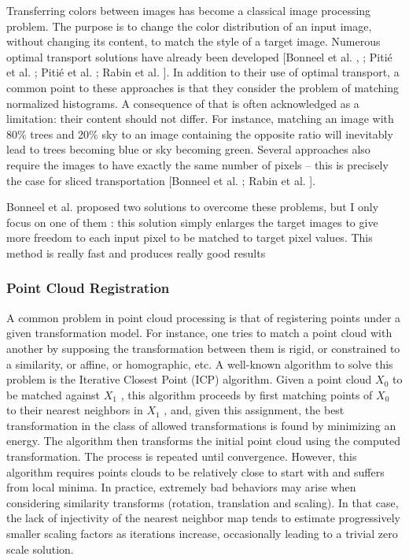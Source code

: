 \documentclass[a4paper,12pt]{article}
\begin{document}
Transferring colors between images has become a classical image processing problem. The purpose is to change the color distribution of an input image, without changing its content, to match the style of a target image. Numerous optimal transport solutions have already been developed [Bonneel et al. \cite{bonneel2015sliced}, \cite{bonneel2013example}; Pitié et al. \cite{pitie2005n}; Pitié et al. \cite{pitie2007automated}; Rabin et al. \cite{rabin2010regularization}]. In addition to their use of optimal transport, a common point to these approaches is that they consider the problem of matching normalized histograms. A consequence of that is often acknowledged as a limitation: their content should not differ. For instance, matching an image with 80\% trees and 20\% sky to an image containing the opposite ratio will inevitably lead to trees becoming blue or sky becoming green. Several approaches also require the images to have exactly the same number of pixels – this is precisely the case for sliced transportation [Bonneel et al. \cite{bonneel2015sliced}; Rabin et al. \cite{rabin2010regularization}].

Bonneel et al. proposed two solutions to overcome these problems, but I only focus on one of them : this solution simply enlarges the target images to give more freedom to each input pixel to be matched to target pixel values. This method is really fast and produces really good results

\subsubsection*{Point Cloud Registration}

A common problem in point cloud processing is that of registering points under a given transformation model. For instance, one tries to match a point cloud with another by supposing the transformation between them is rigid, or constrained to a similarity, or affine, or homographic, etc. A well-known algorithm to solve this problem is the Iterative Closest Point (ICP) algorithm. Given a point cloud $X_0$ to be matched against $X_1$ , this algorithm proceeds by first matching points of $X_0$ to their nearest neighbors in $X_1$ , and, given this assignment, the best transformation in the class of allowed transformations is found by minimizing an energy. The algorithm then transforms the initial point cloud using the computed transformation. The process is repeated until convergence. However, this algorithm requires points clouds to be relatively close to start with and suffers from local minima. In practice, extremely bad behaviors may arise when considering similarity transforms (rotation, translation and scaling). In that case, the lack of injectivity of the nearest neighbor map tends to estimate progressively smaller scaling factors as iterations increase, occasionally leading to a trivial zero scale solution.
\end{document}
